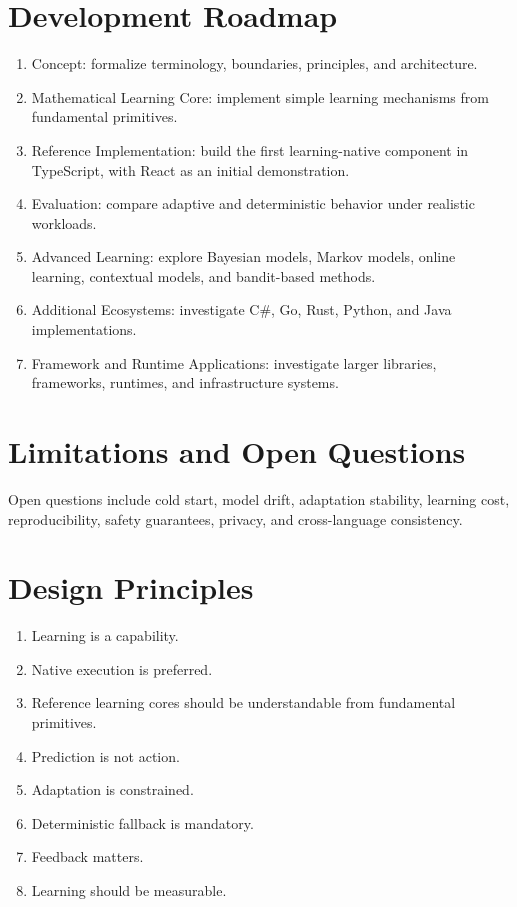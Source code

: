 \documentclass[11pt,a4paper]{article}
\begin{document}
\section{Development Roadmap}
\begin{enumerate}
\item Concept: formalize terminology, boundaries, principles, and architecture.
\item Mathematical Learning Core: implement simple learning mechanisms from fundamental primitives.
\item Reference Implementation: build the first learning-native component in TypeScript, with React as an initial demonstration.
\item Evaluation: compare adaptive and deterministic behavior under realistic workloads.
\item Advanced Learning: explore Bayesian models, Markov models, online learning, contextual models, and bandit-based methods.
\item Additional Ecosystems: investigate C\#, Go, Rust, Python, and Java implementations.
\item Framework and Runtime Applications: investigate larger libraries, frameworks, runtimes, and infrastructure systems.
\end{enumerate}

\section{Limitations and Open Questions}
Open questions include cold start, model drift, adaptation stability, learning cost, reproducibility, safety guarantees, privacy, and cross-language consistency.

\section{Design Principles}
\begin{enumerate}
\item Learning is a capability.
\item Native execution is preferred.
\item Reference learning cores should be understandable from fundamental primitives.
\item Prediction is not action.
\item Adaptation is constrained.
\item Deterministic fallback is mandatory.
\item Feedback matters.
\item Learning should be measurable.
\end{enumerate}
\end{document}
